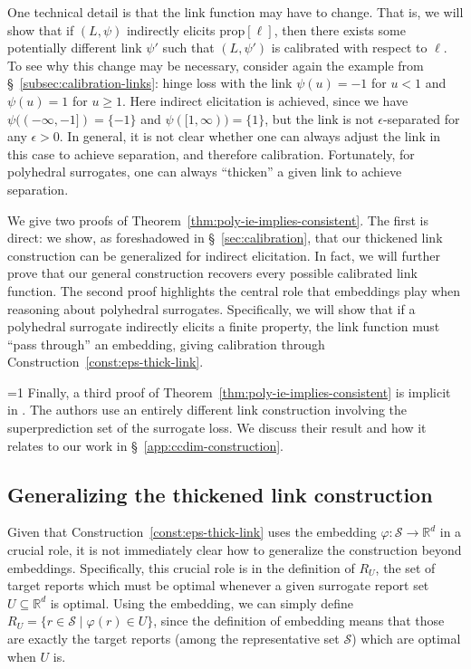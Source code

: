 \documentclass[twoside,11pt]{article}
\newcommand{\Comments}{1}
\newcommand{\mytodo}[2]{\ifnum\Comments=1%
  \todo[linecolor=#1!80!black,backgroundcolor=#1,bordercolor=#1!80!black]{#2}\fi}
\newcommand{\reals}{\mathbb{R}}
\newcommand{\prop}[1]{\mathrm{prop}[#1]}
\newcommand{\Sc}{\mathcal{S}}
\begin{document}
One technical detail is that the link function may have to change.
That is, we will show that if $(L,\psi)$ indirectly elicits $\prop{\ell}$, then there exists some potentially different link $\psi'$ such that $(L,\psi')$ is calibrated with respect to $\ell$.
To see why this change may be necessary, consider again the example from \S~\ref{subsec:calibration-links}:
hinge loss with the link $\psi(u) = -1$ for $u < 1$ and $\psi(u) = 1$ for $u\geq 1$.
Here indirect elicitation is achieved, since we have $\psi((-\infty,-1]) = \{-1\}$ and $\psi([1,\infty)) = \{1\}$, but the link is not $\epsilon$-separated for any $\epsilon>0$.
In general, it is not clear whether one can always adjust the link in this case to achieve separation, and therefore calibration.
Fortunately, for polyhedral surrogates, one can always ``thicken'' a given link to achieve separation.

We give two proofs of Theorem~\ref{thm:poly-ie-implies-consistent}.
The first is direct: we show, as foreshadowed in \S~\ref{sec:calibration}, that our thickened link construction can be generalized for indirect elicitation.
In fact, we will further prove that our general construction recovers every possible calibrated link function.
The second proof highlights the central role that embeddings play when reasoning about polyhedral surrogates.
Specifically, we will show that if a polyhedral surrogate indirectly elicits a finite property, the link function must ``pass through'' an embedding, giving calibration through Construction~\ref{const:eps-thick-link}.

\mytodo{gray!20!white}{Cover: A}
Finally, a third proof of Theorem~\ref{thm:poly-ie-implies-consistent} is implicit in \citet[Theorem 8]{ramaswamy2016convex}.
The authors use an entirely different link construction involving the superprediction set of the surrogate loss.
We discuss their result and how it relates to our work in \S~\ref{app:ccdim-construction}.

\subsection{Generalizing the thickened link construction}

Given that Construction~\ref{const:eps-thick-link} uses the embedding $\varphi:\Sc\to\reals^d$ in a crucial role, it is not immediately clear how to generalize the construction beyond embeddings.
Specifically, this crucial role is in the definition of $R_U$, the set of target reports which must be optimal whenever a given surrogate report set $U\subseteq\reals^d$ is optimal.
Using the embedding, we can simply define $R_U = \{ r\in\Sc \mid \varphi(r) \in U \}$, since the definition of embedding means that those are exactly the target reports (among the representative set $\Sc$) which are optimal when $U$ is.
\end{document}
